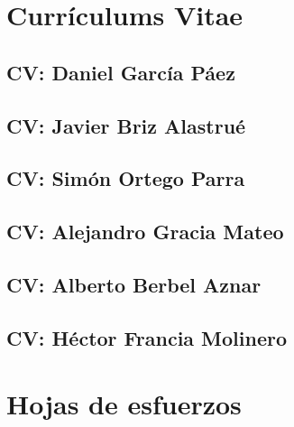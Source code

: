 \documentclass[10pt,spanish]{article}
\begin{document}
\section{Currículums Vitae}


\subsection{CV: Daniel García Páez}


\subsection{CV: Javier Briz Alastrué}


\subsection{CV: Simón Ortego Parra}


\subsection{CV: Alejandro Gracia Mateo}


\subsection{CV: Alberto Berbel Aznar}


\subsection{CV: Héctor Francia Molinero}



\section{Hojas de esfuerzos}

\blindtext
\end{document}
